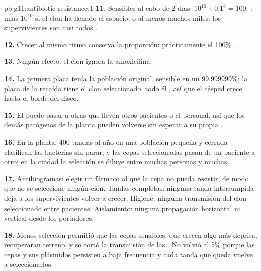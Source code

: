 \begin{solution}{pb:g11:antibiotic-resistance:1}
\textbf{11.} Sensibles al cabo de 2 días: $10^{10} \times 0.1^8 = 100$.
: unas $10^{10}$ si el clon ha llenado el espacio, o al
menos muchos miles: los supervivientes son casi todos .

\textbf{12.} Crecer al mismo ritmo conserva la proporción:
prácticamente el 100\% .

\textbf{13.} Ningún efecto: el clon  ignora la amoxicilina.

\textbf{14.} La primera placa tenía la población original, sensible en
un 99,999999\%; la placa de la recaída tiene el clon seleccionado, todo
él , así que el césped crece hasta el borde del disco.

\textbf{15.} El  puede pasar a otras  que lleven otros
pacientes o el personal, así que los demás patógenos de la planta
pueden volverse  sin esperar a su propia .

\textbf{16.} En la planta, 400 tandas al año en una población pequeña y
cerrada clasifican las bacterias sin parar, y las cepas seleccionadas
pasan de un paciente a otro; en la ciudad la selección se diluye entre
muchas personas y muchas .

\textbf{17.} Antibiogramas: elegir un fármaco al que la cepa no pueda
resistir, de modo que no se seleccione ningún clon. Tandas completas:
ninguna tanda interrumpida deja a los supervivientes  volver
a crecer. Higiene: ninguna transmisión del clon seleccionado entre
pacientes. Aislamiento: ninguna propagación horizontal ni vertical
desde los portadores.

\textbf{18.} Menos selección permitió que las cepas sensibles, que
crecen algo más deprisa, recuperaran terreno, y se cortó la transmisión
de las . No volvió al 5\% porque las cepas  y sus
plásmidos persisten a baja frecuencia y cada tanda que queda vuelve a
seleccionarlos.


\end{solution}
